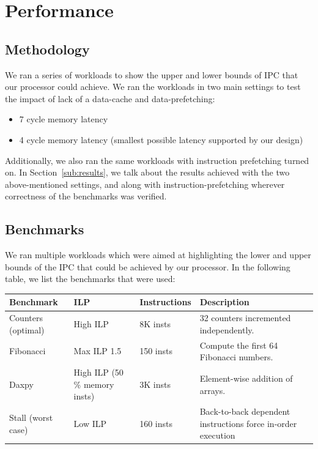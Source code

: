 \documentclass{article}
\begin{document}
\section{Performance}
\label{sec:performance}

\subsection{Methodology}
We ran a series of workloads to show the upper and lower bounds of IPC that our
processor could achieve. We ran the workloads in two main settings to test the
impact of lack of a data-cache and data-prefetching:
\begin{itemize}
\itemsep 0em
	\item 7 cycle memory latency
	\item 4 cycle memory latency (smallest possible latency supported by
	our design)
\end{itemize}

Additionally, we also ran the same workloads with instruction prefetching
turned on. In Section~\ref{sub:results}, we talk about the results achieved
with the two above-mentioned settings, and along with instruction-prefetching
wherever correctness of the benchmarks was verified.

\subsection{Benchmarks}
We ran multiple workloads which were aimed at highlighting the lower and upper
bounds of the IPC that could be achieved by our processor. In the following
table, we list the benchmarks that were used:

\begin{center}
    \begin{tabular}{ | p{1.8cm} | p{1.9cm} | p{1.75cm} | p{5cm} |}
    \hline
    Benchmark & ILP & Instructions & Description \\ \hline
    Counters (optimal) & High ILP & 8K insts & 32 counters incremented
    independently. \\ \hline
    Fibonacci & Max ILP 1.5 & 150 insts & Compute the first 64 Fibonacci
    numbers. \\ \hline
    Daxpy & High ILP (50 \% memory insts) & 3K insts & Element-wise addition of
    arrays. \\ \hline
    Stall (worst case) & Low ILP & 160 insts & Back-to-back dependent
    instructions force in-order execution \\
    \hline
    \end{tabular}
\end{center}
\end{document}
